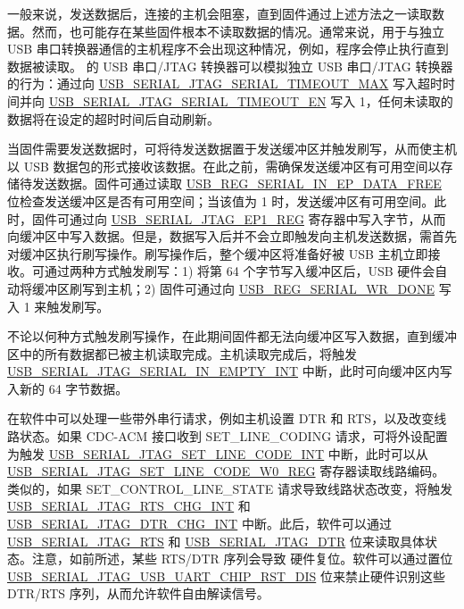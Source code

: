 \documentclass[main\_\_CN.tex]{subfiles}
\begin{document}
一般来说，发送数据后，连接的主机会阻塞，直到固件通过上述方法之一读取数据。然而，也可能存在某些固件根本不读取数据的情况。通常来说，用于与独立 USB 串口转换器通信的主机程序不会出现这种情况，例如，程序会停止执行直到数据被读取。\chipname{} 的 USB 串口/JTAG 转换器可以模拟独立 USB 串口/JTAG 转换器的行为：通过向 \hyperref[fielddesc:USBSERIALJTAGSERIALTIMEOUTMAX]{USB\_SERIAL\_JTAG\_SERIAL\_TIMEOUT\_MAX} 写入超时时间并向 \hyperref[fielddesc:USBSERIALJTAGSERIALTIMEOUTEN]{USB\_SERIAL\_JTAG\_SERIAL\_TIMEOUT\_EN} 写入 1，任何未读取的数据将在设定的超时时间后自动刷新。

当固件需要发送数据时，可将待发送数据置于发送缓冲区并触发刷写，从而使主机以 USB 数据包的形式接收该数据。在此之前，需确保发送缓冲区有可用空间以存储待发送数据。固件可通过读取 \hyperref[fielddesc:USBSERIALJTAGSERIALINEPDATAFREE]{USB\_REG\_SERIAL\_IN\_EP\_DATA\_FREE} 位检查发送缓冲区是否有可用空间；当该值为 1 时，发送缓冲区有可用空间。此时，固件可通过向 \hyperref[fielddesc:USBSERIALJTAGRDWRBYTE]{USB\_SERIAL\_JTAG\_EP1\_REG} 寄存器中写入字节，从而向缓冲区中写入数据。但是，数据写入后并不会立即触发向主机发送数据，需首先对缓冲区执行刷写操作。刷写操作后，整个缓冲区将准备好被 USB 主机立即接收。可通过两种方式触发刷写：1) 将第 64 个字节写入缓冲区后，USB 硬件会自动将缓冲区刷写到主机；2) 固件可通过向 \hyperref[fielddesc:USBSERIALJTAGWRDONE]{USB\_REG\_SERIAL\_WR\_DONE} 写入 1 来触发刷写。

不论以何种方式触发刷写操作，在此期间固件都无法向缓冲区写入数据，直到缓冲区中的所有数据都已被主机读取完成。主机读取完成后，将触发 \hyperref[fielddesc:USBSERIALJTAGSERIALINEMPTYINTRAW]{USB\_SERIAL\_JTAG\_SERIAL\_IN\_EMPTY\_INT} 中断，此时可向缓冲区内写入新的 64 字节数据。

在软件中可以处理一些带外串行请求，例如主机设置 DTR 和 RTS，以及改变线路状态。如果 CDC-ACM 接口收到 SET\_LINE\_CODING 请求，可将外设配置为触发 \hyperref[int:USBSERIALJTAGSETLINECODEINT]{USB\_SERIAL\_JTAG\_SET\_LINE\_CODE\_INT} 中断，此时可以从 \hyperref[regdesc:USBSERIALJTAGSETLINECODEW0REG]{USB\_SERIAL\_JTAG\_SET\_LINE\_CODE\_W0\_REG} 寄存器读取线路编码。类似的，如果 SET\_CONTROL\_LINE\_STATE 请求导致线路状态改变，将触发 \hyperref[int:USBSERIALJTAGRTSCHGINT]{USB\_SERIAL\_JTAG\_RTS\_CHG\_INT} 和 \hyperref[int:USBSERIALJTAGDTRCHGINT]{USB\_SERIAL\_JTAG\_DTR\_CHG\_INT} 中断。此后，软件可以通过 \hyperref[fielddesc:USBSERIALJTAGRTS]{USB\_SERIAL\_JTAG\_RTS} 和 \hyperref[fielddesc:USBSERIALJTAGDTR]{USB\_SERIAL\_JTAG\_DTR} 位来读取具体状态。注意，如前所述，某些 RTS/DTR 序列会导致 \chipname{} 硬件复位。软件可以通过置位 \hyperref[fielddesc:USBSERIALJTAGUSBUARTCHIPRSTDIS]{USB\_SERIAL\_JTAG\_USB\_UART\_CHIP\_RST\_DIS} 位来禁止硬件识别这些 DTR/RTS 序列，从而允许软件自由解读信号。
\end{document}

